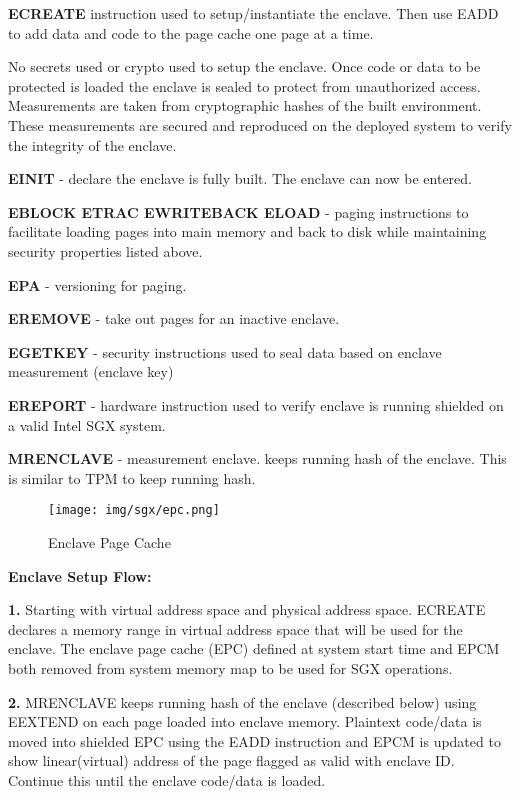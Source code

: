 \textbf{ECREATE} instruction used to setup/instantiate the enclave. Then use EADD to add data and code to the page cache one page at a time. 

No secrets used or crypto used to setup the enclave. Once code or data to be protected is loaded the enclave is sealed to protect from unauthorized access. Measurements are taken from cryptographic hashes of the built environment. These measurements are secured and reproduced on the deployed system to verify the integrity of the enclave. 

\textbf{EINIT} - declare the enclave is fully built. The enclave can now be entered. 

\textbf{EBLOCK ETRAC EWRITEBACK ELOAD} - paging instructions to facilitate loading pages into main memory and back to disk while maintaining security properties listed above. 

\textbf{EPA} - versioning for paging. 

\textbf{EREMOVE} - take out pages for an inactive enclave. 

\textbf{EGETKEY} - security instructions used to seal data based on enclave measurement (enclave key) 

\textbf{EREPORT} - hardware instruction used to verify enclave is running shielded on a valid Intel SGX system. 

\textbf{MRENCLAVE} - measurement enclave. keeps running hash of the enclave. This is similar to TPM to keep running hash. 

\begin{figure}[H]
\centering
\texttt{[image: img/sgx/epc.png]}
\caption{Enclave Page Cache \cite{Costan_Devadas_2016}}
\end{figure}

\textbf{Enclave Setup Flow:}

\textbf{1.} Starting with virtual address space and physical address space. ECREATE declares a memory range in virtual address space that will be used for the enclave. The enclave page cache (EPC) defined at system start time and EPCM both removed from system memory map to be used for SGX operations. 

\textbf{2.} MRENCLAVE keeps running hash of the enclave (described below) using EEXTEND on each page loaded into enclave memory. Plaintext code/data is moved into shielded EPC using the EADD instruction and EPCM is updated to show linear(virtual) address of the page flagged as valid with enclave ID. Continue this until the enclave code/data is loaded. 

